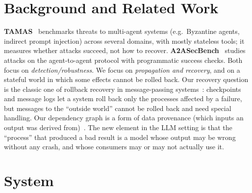 \documentclass[11pt]{article}
\begin{document}
\section{Background and Related Work}
\label{sec:related}
\textbf{TAMAS}~\cite{tamas} benchmarks threats to multi-agent systems
(e.g.\ Byzantine agents, indirect prompt injection) across several domains,
with mostly stateless tools; it measures whether attacks succeed, not how to
recover. \textbf{A2ASecBench}~\cite{a2asecbench} studies attacks on the
agent-to-agent protocol with programmatic success checks. Both focus on
\emph{detection/robustness}. We focus on \emph{propagation and recovery}, and
on a stateful world in which some effects cannot be rolled back.
Our recovery question is the classic one of rollback recovery in
message-passing systems~\cite{elnozahy2002survey}: checkpoints and message
logs let a system roll back only the processes affected by a failure, but
messages to the ``outside world'' cannot be rolled back and need special
handling. Our dependency graph is a form of data provenance (which inputs an
output was derived from)~\cite{buneman2001why}. The new element in the LLM
setting is that the ``process'' that produced a bad result is a model whose
output may be wrong without any crash, and whose consumers may or may not
actually use it.

\section{System}
\label{sec:system}
\end{document}
